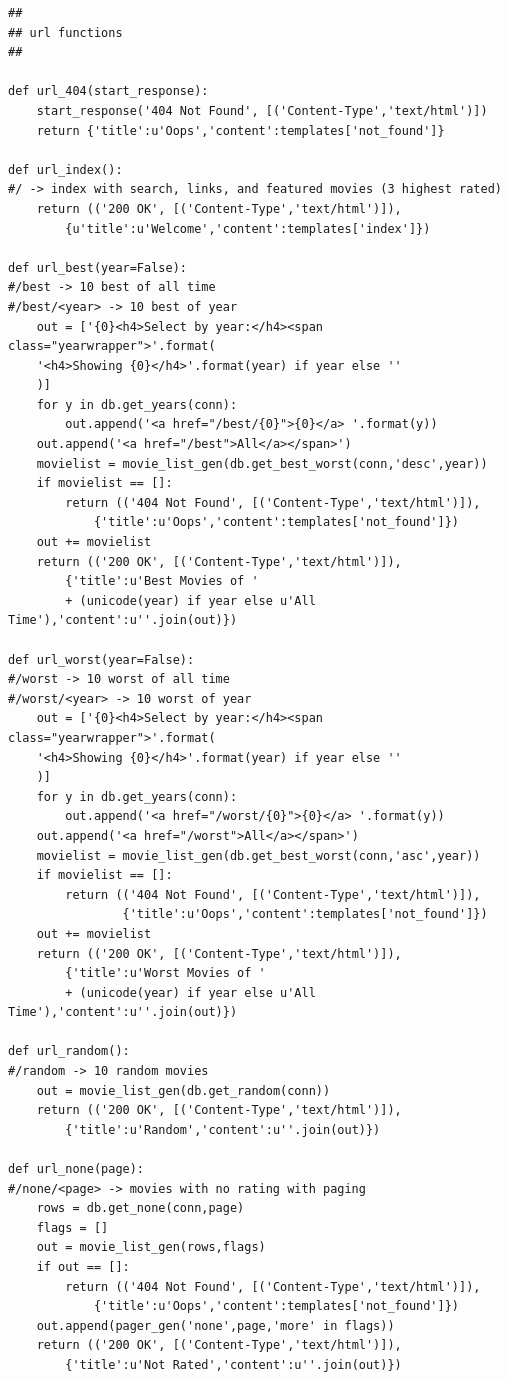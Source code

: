 \documentclass[10pt,a4paper]{scrreprt}
\begin{document}
\begin{appendices}
\begin{verbatim}
##
## url functions
##

def url_404(start_response):
    start_response('404 Not Found', [('Content-Type','text/html')])
    return {'title':u'Oops','content':templates['not_found']}

def url_index():
#/ -> index with search, links, and featured movies (3 highest rated)
    return (('200 OK', [('Content-Type','text/html')]),
        {u'title':u'Welcome','content':templates['index']})

def url_best(year=False):
#/best -> 10 best of all time
#/best/<year> -> 10 best of year
    out = ['{0}<h4>Select by year:</h4><span class="yearwrapper">'.format(
    '<h4>Showing {0}</h4>'.format(year) if year else ''
    )]
    for y in db.get_years(conn):
        out.append('<a href="/best/{0}">{0}</a> '.format(y))
    out.append('<a href="/best">All</a></span>')
    movielist = movie_list_gen(db.get_best_worst(conn,'desc',year))
    if movielist == []:
        return (('404 Not Found', [('Content-Type','text/html')]),
            {'title':u'Oops','content':templates['not_found']})
    out += movielist
    return (('200 OK', [('Content-Type','text/html')]),
        {'title':u'Best Movies of ' 
        + (unicode(year) if year else u'All Time'),'content':u''.join(out)})

def url_worst(year=False):
#/worst -> 10 worst of all time
#/worst/<year> -> 10 worst of year
    out = ['{0}<h4>Select by year:</h4><span class="yearwrapper">'.format(
    '<h4>Showing {0}</h4>'.format(year) if year else ''
    )]
    for y in db.get_years(conn):
        out.append('<a href="/worst/{0}">{0}</a> '.format(y))
    out.append('<a href="/worst">All</a></span>')
    movielist = movie_list_gen(db.get_best_worst(conn,'asc',year))
    if movielist == []:
        return (('404 Not Found', [('Content-Type','text/html')]),
                {'title':u'Oops','content':templates['not_found']})
    out += movielist
    return (('200 OK', [('Content-Type','text/html')]),
        {'title':u'Worst Movies of '
        + (unicode(year) if year else u'All Time'),'content':u''.join(out)})

def url_random():
#/random -> 10 random movies
    out = movie_list_gen(db.get_random(conn))
    return (('200 OK', [('Content-Type','text/html')]),
        {'title':u'Random','content':u''.join(out)})

def url_none(page):
#/none/<page> -> movies with no rating with paging
    rows = db.get_none(conn,page)
    flags = []
    out = movie_list_gen(rows,flags)
    if out == []:
        return (('404 Not Found', [('Content-Type','text/html')]),
            {'title':u'Oops','content':templates['not_found']})
    out.append(pager_gen('none',page,'more' in flags))
    return (('200 OK', [('Content-Type','text/html')]),
        {'title':u'Not Rated','content':u''.join(out)})


\end{verbatim}
\end{appendices}
\end{document}
